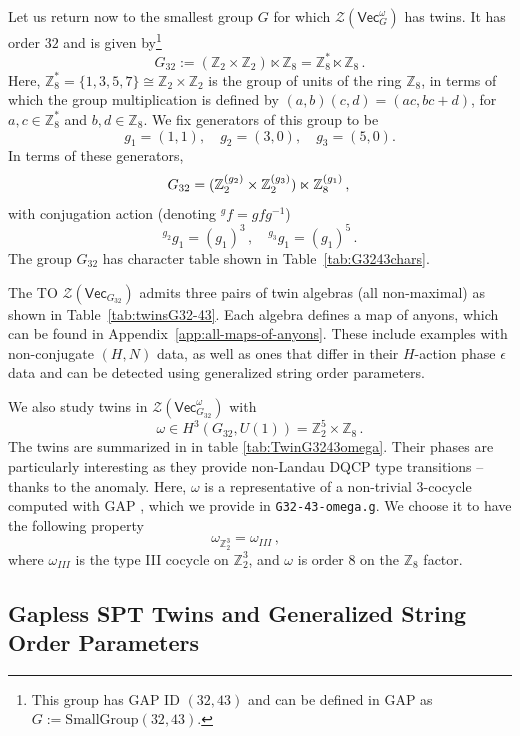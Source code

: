 \documentclass[aps,twocolumn,prx,floatfix,preprintnumbers, nofootinbib,10pt]{revtex4-2}
\numberwithin{equation}{section}
\theoremstyle{definition}
\newcommand{\be}{\begin{equation}}
\newcommand{\ee}{\end{equation}}
\newcommand{\Z}{{\mathbb Z}}
\newcommand{\cZ}{\mathcal{Z}}
\renewcommand{\Vec}{\mathsf{Vec}}
\begin{document}
Let us return now to the smallest group $G$ for which $\cZ(\Vec_G^\omega)$ has twins. It has order $32$ and is given by\footnote{This group has GAP ID $(32,43)$ and can be defined in GAP as $G:=\text{SmallGroup}(32, 43)$.} 
\be
    G_{32}:=(\Z_2 \times \Z_2) \ltimes \Z_8 = \Z_8^*\ltimes \Z_8  \,.
\ee
Here, $\Z_8^*=\{1,3,5,7\}\cong \Z_2\times \Z_2$ is the group of units of the ring $\Z_8$, in terms of which the group multiplication is defined by $(a,b)(c,d)=(ac,bc+d)$, for $a,c\in \Z_8^*$ and $b,d\in \Z_8$. We fix generators of this group to be 
\be
\label{eqn:generatorsG32-43}
    g_1=(1,1), \quad g_2 = (3,0), \quad g_3 = (5,0).
\ee
In terms of these generators,
\be
G_{32}=(\Z_2^{(g_2)} \times \Z_2^{(g_3)}) \ltimes \Z_8^{(g_1)}\,,\\
\ee
with conjugation action (denoting ${}^{g}\!f = gfg^{-1}$)
\be
{}^{g_2}\!g_1=(g_1)^3\,,\quad {}^{g_3}\!g_1=(g_1)^5\,.
\ee
The group $G_{32}$ has character table shown in Table~\ref{tab:G3243chars}. 


The TO $\cZ(\Vec_{G_{32}})$ admits three pairs of twin algebras (all non-maximal) as shown in Table~\ref{tab:twinsG32-43}. 
Each algebra defines a map of anyons, which can be found in Appendix~\ref{app:all-maps-of-anyons}. These include examples with non-conjugate $(H, N)$ data, as well as ones that differ in their $H$-action phase $\epsilon$ data and can be detected using generalized string order parameters. 


We also study twins in $\cZ(\Vec_{G_{32}}^\omega)$ with 
\be \omega \in H^3(G_{32}, U(1)) = \Z_2^5 \times \Z_8 \,.
\ee
The twins are summarized in
 in table \ref{tab:TwinG3243omega}. 
Their phases are particularly interesting as they provide non-Landau DQCP type transitions -- thanks to the anomaly.  
  Here, $\omega$ is a representative of a non-trivial 3-cocycle computed with GAP \cite{GAP4,HAP,mignard2017moritaequivalencepointedfusion}, which we provide in \texttt{G32-43-omega.g}. We choose it to have the following property
  \be
\omega_{\Z_2^3} = \omega_{III} \,,\qquad 
  \ee
  where $\omega_{III}$ is the type III cocycle on $\Z_2^3$, 
and $\omega$ is order $8$ on the $\Z_8$ factor. 



\subsection{Gapless SPT Twins and Generalized String Order Parameters}
\label{sec:twinexample_epsilon}
\end{document}

